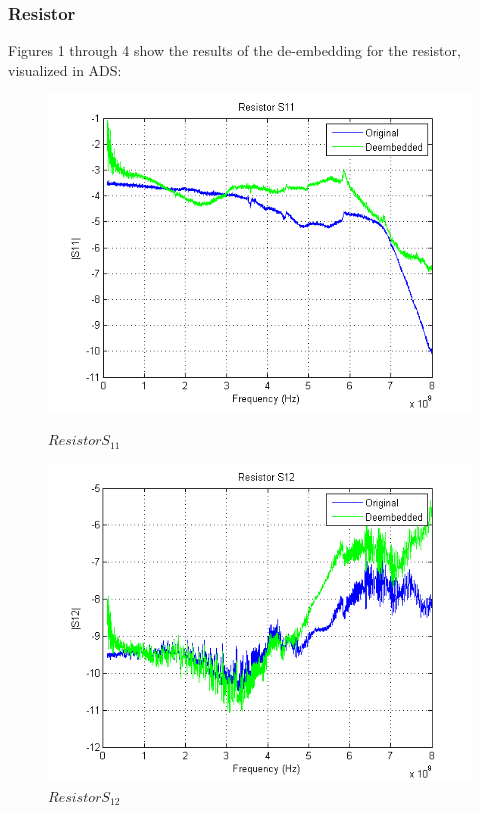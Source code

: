 \documentclass{article} %
\begin{document}
	\subsubsection{Resistor}
	Figures 1 through 4 show the results of the de-embedding for the resistor, visualized in ADS:

	\begin{figure}[!ht] %
	\begin{center}
		\label{fig:RS11}
	\includegraphics{ResistorS11}
	\caption{$Resistor S_{11}$}
	\end{center}
	\end{figure}
	
	\begin{figure}[H]
	\centering
	\label{fig:RS12}
	\caption{$Resistor S_{12}$}
	\includegraphics{ResistorS12}
	\end{figure}
	
\end{document}
